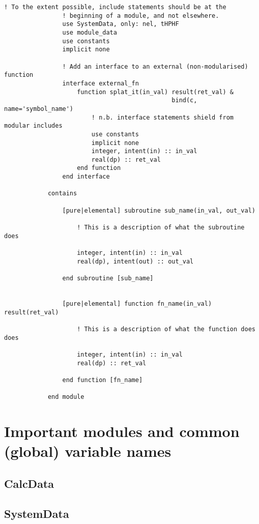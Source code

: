 \documentclass[a4paper,notitlepage]{scrreprt}
\begin{document}
\begin{description}
\begin{lstlisting}[gobble=12]
            	! To the extent possible, include statements should be at the
				! beginning of a module, and not elsewhere.
            	use SystemData, only: nel, tHPHF
            	use module_data
            	use constants
            	implicit none

            	! Add an interface to an external (non-modularised) function
            	interface external_fn
            		function splat_it(in_val) result(ret_val) &
											  bind(c, name='symbol_name')
            			! n.b. interface statements shield from modular includes
            			use constants
            			implicit none
            			integer, intent(in) :: in_val
            			real(dp) :: ret_val
            		end function
            	end interface

            contains

            	[pure|elemental] subroutine sub_name(in_val, out_val)

            		! This is a description of what the subroutine does

            		integer, intent(in) :: in_val
            		real(dp), intent(out) :: out_val

            	end subroutine [sub_name]


            	[pure|elemental] function fn_name(in_val) result(ret_val)

            		! This is a description of what the function does does

            		integer, intent(in) :: in_val
            		real(dp) :: ret_val

            	end function [fn_name]

            end module
		\end{lstlisting}

\end{description}

\section{Important modules and common (global) variable names}
\label{sect:cons-types}

\subsection{\ttfamily CalcData}
\subsection{\ttfamily SystemData}
\end{document}
